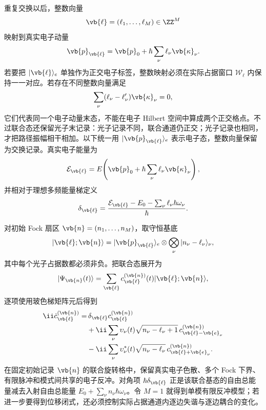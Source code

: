 重复交换以后，整数向量
\[
\vb{\ell}=(\ell_1,\ldots,\ell_M)\in\ZZ^M
\]
映射到真实电子动量
\begin{equation*}
\vb{p}_{\vb{\ell}}
=
\vb{p}_0
+\hbar\sum_\nu\ell_\nu\vb{\kappa}_\nu .
\end{equation*}
若要把 $|\vb{\ell}\rangle_e$ 单独作为正交电子标签，整数映射必须在实际占据窗口 $\mathcal W_\ell$ 内保持一一对应。若存在不同整数向量满足
\[
\sum_\nu
(\ell_\nu-\ell_\nu')\vb{\kappa}_\nu=0,
\]
它们代表同一个电子动量末态，不能在电子 Hilbert 空间中算成两个正交格点。不过联合态还保留光子末记录：光子记录不同，联合通道仍正交；光子记录也相同，才把路径振幅相干相加。以下统一用 $|\vb{p}_{\vb{\ell}}\rangle_e$ 表示电子态，整数向量保留为交换记录。真实电子能量为
\begin{equation}
 \mathcal E_{\vb{\ell}}
 =E\!\left(
 \vb{p}_0+\hbar\sum_\nu
 \ell_\nu\vb{\kappa}_\nu
 \right),
\end{equation}
并相对于理想多频能量梯定义
\begin{equation}
{
 \delta_{\vb{\ell}}
 =
 \frac{
 \mathcal E_{\vb{\ell}}-E_0
 -\sum_\nu\ell_\nu\hbar\omega_\nu
 }{\hbar}.}
\label{eq:multimode_recoil_detuning_dp47}
\end{equation}

对初始 Fock 扇区
$\vb{n}=(n_1,\ldots,n_M)$，取守恒基底
\[
 |\vb{\ell};\vb{n}\rangle
 =
 |\vb{p}_{\vb{\ell}}\rangle_e
 \otimes
 \bigotimes_\nu
 |n_\nu-\ell_\nu\rangle_\nu ,
\]
其中每个光子占据数都必须非负。把联合态展开为
\[
|\Psi_{\vb{n}}(t)\rangle
=
\sum_{\vb{\ell}}
c_{\vb{\ell}}^{(\vb{n})}(t)
|\vb{\ell};\vb{n}\rangle ,
\]
逐项使用玻色梯矩阵元后得到
\begin{equation}
{
\begin{aligned}
 \ii\dot c_{\vb{\ell}}^{(\vb{n})}
 =&\,\delta_{\vb{\ell}}
 c_{\vb{\ell}}^{(\vb{n})}\\
 &+\ii\sum_\nu \upsilon_\nu(t)
 \sqrt{n_\nu-\ell_\nu+1}\,
 c_{\vb{\ell}-\vb{e}_\nu}^{(\vb{n})}\\
 &-\ii\sum_\nu \upsilon_\nu^*(t)
 \sqrt{n_\nu-\ell_\nu}\,
 c_{\vb{\ell}+\vb{e}_\nu}^{(\vb{n})} .
\end{aligned}}
\label{eq:multimode_qpinem_lattice_dp47}
\end{equation}
在固定初始记录 $\vb{n}$ 的联合旋转格中，保留真实电子色散、多个 Fock 下界、有限脉冲和模式间共享的电子反冲。对角项 $\hbar\delta_{\vb{\ell}}$ 正是该联合基态的自由总能量减去入射自由总能量 $E_0+\sum_\nu n_\nu\hbar\omega_\nu$。令 $M=1$ 就得到单模有限反冲模型；若进一步要得到位移闭式，还必须控制实际占据通道内逐边失谐与逐边耦合的变化。

